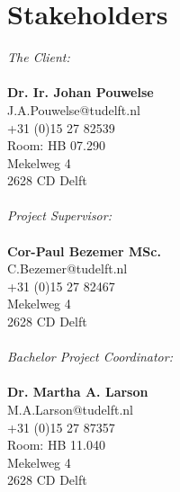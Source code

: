 \section{Stakeholders}
\textit{The Client:}\\
\\
\textbf{Dr. Ir. Johan Pouwelse}\\
J.A.Pouwelse@tudelft.nl\\
+31 (0)15 27 82539\\
Room: HB 07.290\\
Mekelweg 4\\
2628 CD Delft\\
\\
\textit{Project Supervisor:}\\
\\
\textbf{Cor-Paul Bezemer MSc.}\\
C.Bezemer@tudelft.nl\\ 
+31 (0)15 27 82467\\
Mekelweg 4\\
2628 CD Delft\\
\\
\textit{Bachelor Project Coordinator:}\\
\\
\textbf{Dr. Martha A. Larson}\\
M.A.Larson@tudelft.nl\\
+31 (0)15 27 87357\\
Room: HB 11.040\\
Mekelweg 4\\
2628 CD Delft\\
